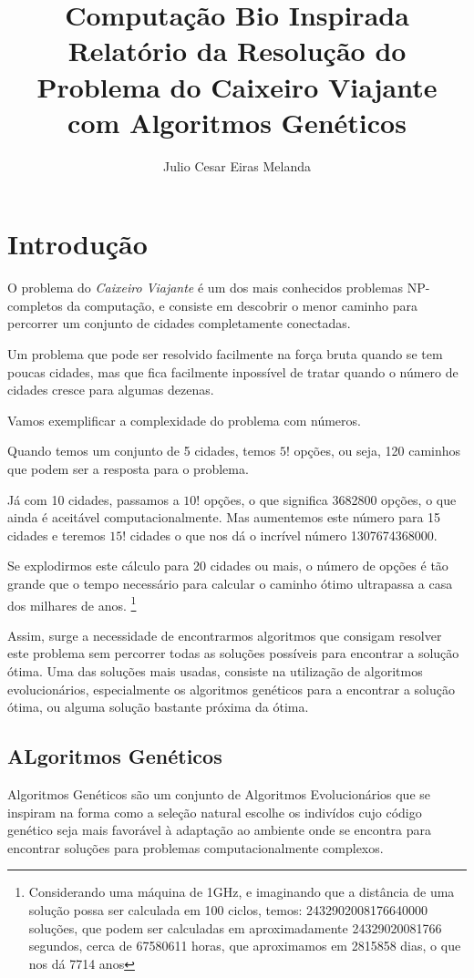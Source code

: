 \documentclass[a4paper,12pt]{article}
\author{Julio Cesar Eiras Melanda}
\title{Computação Bio Inspirada \\
      Relatório da Resolução do Problema do Caixeiro
      Viajante com Algoritmos Genéticos}
\begin{document}
  \maketitle
  \tableofcontents
  \section{Introdução}
  O problema do \emph{Caixeiro Viajante} é um dos mais conhecidos problemas
  NP-completos da computação, e consiste em descobrir o menor caminho para
  percorrer um conjunto de cidades completamente conectadas.

  Um problema que pode ser resolvido facilmente na força bruta quando se tem
  poucas cidades, mas que fica facilmente inpossível de tratar quando o número
  de cidades cresce para algumas dezenas.

  Vamos exemplificar a complexidade do problema com números.

  Quando temos um conjunto de 5 cidades, temos $5!$ opções, ou seja, 120
  caminhos que podem ser a resposta para o problema.

  Já com 10 cidades, passamos a $10!$ opções, o que significa 3682800 opções, o
  que ainda é aceitável computacionalmente. Mas aumentemos este número para 15
  cidades e teremos $15!$ cidades o que nos dá o incrível número 1307674368000.

  Se explodirmos este cálculo para 20 cidades ou mais, o número de opções é tão
  grande que o tempo necessário para calcular o caminho ótimo ultrapassa a
  casa dos milhares de anos.
  \footnote{Considerando uma máquina de 1GHz, e imaginando que
  a distância de uma solução possa ser calculada em 100 ciclos, temos:
  2432902008176640000 soluções, que podem ser calculadas em
  aproximadamente 24329020081766 segundos, cerca de 67580611
  horas, que aproximamos em 2815858 dias, o que nos dá 7714 anos}

  Assim, surge a necessidade de encontrarmos algoritmos que consigam resolver
  este problema sem percorrer todas as soluções possíveis para encontrar a
  solução ótima. Uma das soluções mais usadas, consiste na utilização de
  algoritmos evolucionários, especialmente os algoritmos genéticos para a
  encontrar a solução ótima, ou alguma solução bastante próxima da ótima.

  \subsection{ALgoritmos Genéticos}
  Algoritmos Genéticos são um conjunto de Algoritmos Evolucionários que se
  inspiram na forma como a seleção natural escolhe os indivídos cujo código
  genético seja mais favorável à adaptação ao ambiente onde se encontra para
  encontrar soluções para problemas computacionalmente complexos.
\end{document}

